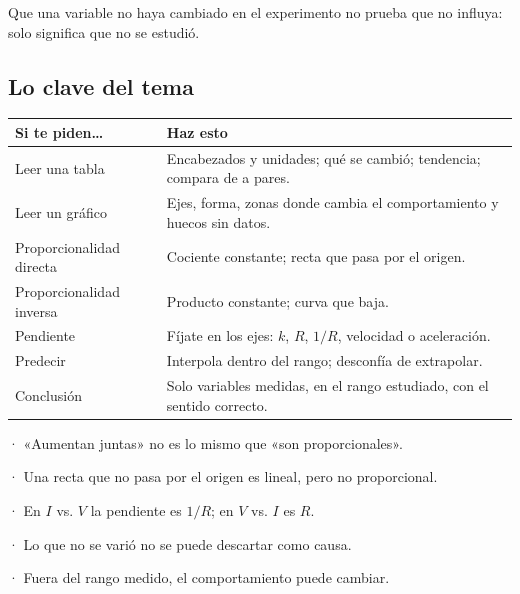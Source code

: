 \begin{clave}[{Recuerda}] Que una variable no haya cambiado en el experimento no prueba que no influya: solo significa que no se estudió.\end{clave}
\subsection{Lo clave del tema}
\begin{center}\small
\begin{tabularx}{\linewidth}{@{}>{\raggedright\arraybackslash\hsize=0.75\hsize}X>{\raggedright\arraybackslash\hsize=1.25\hsize}X@{}}
\toprule
\textbf{Si te piden\dots{}} & \textbf{Haz esto} \\
\midrule
Leer una tabla & Encabezados y unidades; qué se cambió; tendencia; compara de a pares. \\
Leer un gráfico & Ejes, forma, zonas donde cambia el comportamiento y huecos sin datos. \\
Proporcionalidad directa & Cociente constante; recta que pasa por el origen. \\
Proporcionalidad inversa & Producto constante; curva que baja. \\
Pendiente & Fíjate en los ejes: $k$, $R$, $1/R$, velocidad o aceleración. \\
Predecir & Interpola dentro del rango; desconfía de extrapolar. \\
Conclusión & Solo variables medidas, en el rango estudiado, con el sentido correcto. \\
\bottomrule
\end{tabularx}
\end{center}
 
\begin{clave}[{Recuerda}] · «Aumentan juntas» no es lo mismo que «son proporcionales».\par · Una recta que no pasa por el origen es lineal, pero no proporcional.\par · En $I$ vs. $V$ la pendiente es $1/R$; en $V$ vs. $I$ es $R$.\par · Lo que no se varió no se puede descartar como causa.\par · Fuera del rango medido, el comportamiento puede cambiar.\end{clave}
 
